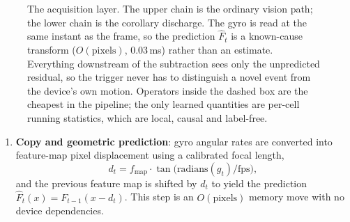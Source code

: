 \documentclass[12pt,a4paper]{article}
\begin{document}
\begin{figure}[htbp]
\begin{tikzpicture}[node distance=5mm and 6mm]
  \end{tikzpicture}
  \caption{The acquisition layer. The upper chain is the ordinary vision path; the lower chain is the corollary discharge. The gyro is read at the same instant as the frame, so the prediction $\hat F_t$ is a known-cause transform ($O(\text{pixels})$, 0.03\,ms) rather than an estimate. Everything downstream of the subtraction sees only the unpredicted residual, so the trigger never has to distinguish a novel event from the device's own motion. Operators inside the dashed box are the cheapest in the pipeline; the only learned quantities are per-cell running statistics, which are local, causal and label-free.}
  \label{fig:pipeline}
\end{figure}

\begin{enumerate}
  \item \textbf{Copy and geometric prediction}: gyro angular rates are converted into feature-map pixel displacement using a calibrated focal length,
  \begin{equation}
    d_t = f_{\mathrm{map}} \cdot \tan\!\big(\mathrm{radians}(g_t) / \mathrm{fps}\big),
  \end{equation}
  and the previous feature map is shifted by $d_t$ to yield the prediction $\hat F_t(x) = F_{t-1}(x - d_t)$. This step is an $O(\text{pixels})$ memory move with no device dependencies.


\end{enumerate}
\end{document}
